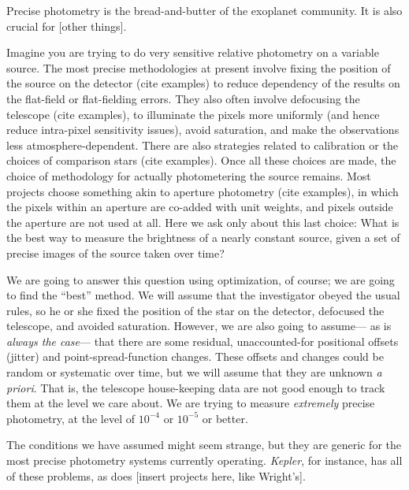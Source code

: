\documentclass[12pt,letterpaper]{article}
\newcommand{\foreign}[1]{\textsl{#1}}
\newcommand{\project}[1]{\textsl{#1}}
\begin{document}
Precise photometry is the bread-and-butter of the exoplanet community.
It is also crucial for [other things].

Imagine you are trying to do very sensitive relative photometry on a variable source.
The most precise methodologies at present involve fixing the position of the source on the detector
  (cite examples)
  to reduce dependency of the results on the flat-field or flat-fielding errors.
They also often involve defocusing the telescope
  (cite examples),
  to illuminate the pixels more uniformly
  (and hence reduce intra-pixel sensitivity issues),
  avoid saturation,
  and make the observations less atmosphere-dependent.
There are also strategies related to calibration or the choices of comparison stars
  (cite examples).
Once all these choices are made,
  the choice of methodology for actually photometering the source remains.
Most projects choose something akin to aperture photometry
  (cite examples),
  in which the pixels within an aperture are co-added with unit weights,
  and pixels outside the aperture are not used at all.
Here we ask only about this last choice:
What is the best way to measure the brightness of a nearly constant source,
  given a set of precise images of the source taken over time?

We are going to answer this question using optimization, of course;
  we are going to find the ``best'' method.
We will assume that the investigator obeyed the usual rules,
  so he or she fixed the position of the star on the detector,
  defocused the telescope,
  and avoided saturation.
However, we are also going to assume---%
  as is \emph{always the case}---%
  that there are some residual,
  unaccounted-for positional offsets (jitter) and point-spread-function changes.
These offsets and changes could be random or systematic over time,
  but we will assume that they are unknown \foreign{a priori}.
That is, the telescope house-keeping data are not good enough to track them at the level we care about.
We are trying to measure \emph{extremely} precise photometry,
  at the level of $10^{-4}$ or $10^{-5}$ or better.

The conditions we have assumed might seem strange,
  but they are generic for the most precise photometry systems currently operating.
\project{Kepler}, for instance, has all of these problems,
  as does [insert projects here, like Wright's].

\end{document}
